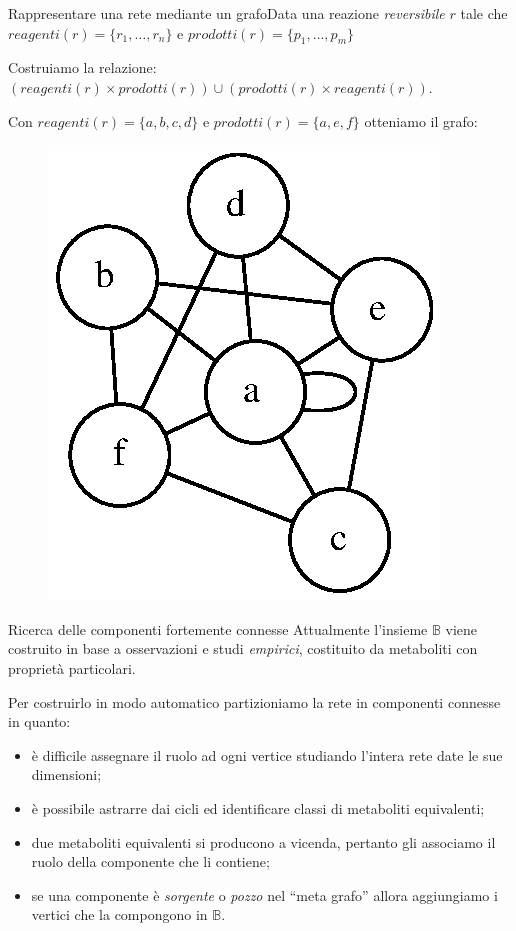 \documentclass{beamer}
\begin{document}
\begin{frame}{Rappresentare una rete mediante un grafo}{Data una
    reazione \emph{reversibile} $r$ tale che $reagenti(r) = \{ r_{1},
    \ldots, r_{n} \}$ e $prodotti(r) = \{ p_{1}, \ldots, p_{m} \}$}

  Costruiamo la relazione: $(reagenti(r) \times prodotti(r)) \cup
  (prodotti(r) \times reagenti(r))$.
  
    \begin{example}
      Con $reagenti(r) = \{ a, b, c, d \}$ e $prodotti(r) = \{a, e,
      f\}$ otteniamo il grafo:
      \begin{figure}
        \centering
        \includegraphics[scale=.6]{images/reversible-reaction-example.dot.eps}
        \label{fig:reversible-reaction-mapping}
      \end{figure}
    \end{example}
\end{frame}

\begin{frame}{Ricerca delle componenti fortemente connesse}
  Attualmente l'insieme $\mathbb{B}$ viene costruito in base a
  osservazioni e studi \emph{empirici}, costituito da metaboliti con
  propriet\`a particolari.

  Per costruirlo in modo automatico partizioniamo la rete in
  componenti connesse in quanto:
\begin{itemize}
\item<2-> \`e difficile assegnare il ruolo ad ogni vertice studiando
  l'intera rete date le sue dimensioni;
\item<3-> \`e possibile astrarre dai cicli ed identificare classi di
  metaboliti equivalenti;
\item<4-> due metaboliti equivalenti si producono a vicenda, pertanto
  gli associamo il ruolo della componente che li contiene;
\item<5-> se una componente \`e \emph{sorgente} o \emph{pozzo} nel
  ``meta grafo'' allora aggiungiamo i vertici che la compongono in
  $\mathbb{B}$.
\end{itemize}
\end{frame}
\end{document}
